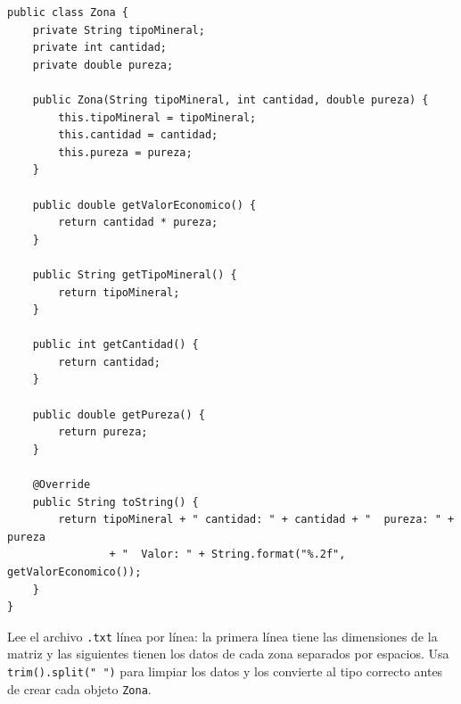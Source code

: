 \documentclass[12pt]{article}
\begin{document}
\begin{verbatim}
public class Zona {
    private String tipoMineral;
    private int cantidad;
    private double pureza;

    public Zona(String tipoMineral, int cantidad, double pureza) {
        this.tipoMineral = tipoMineral;
        this.cantidad = cantidad;
        this.pureza = pureza;
    }

    public double getValorEconomico() {
        return cantidad * pureza;
    }

    public String getTipoMineral() {
        return tipoMineral;
    }

    public int getCantidad() {
        return cantidad;
    }

    public double getPureza() {
        return pureza;
    }

    @Override
    public String toString() {
        return tipoMineral + " cantidad: " + cantidad + "  pureza: " + pureza
                + "  Valor: " + String.format("%.2f", getValorEconomico());
    }
}

\end{verbatim}

Lee el archivo \texttt{.txt} línea por línea: la primera línea tiene las dimensiones 
de la matriz y las siguientes tienen los datos de cada zona separados por espacios.
Usa \texttt{trim().split(" ")} para limpiar los datos y los convierte al tipo 
correcto antes de crear cada objeto \texttt{Zona}.
\end{document}
